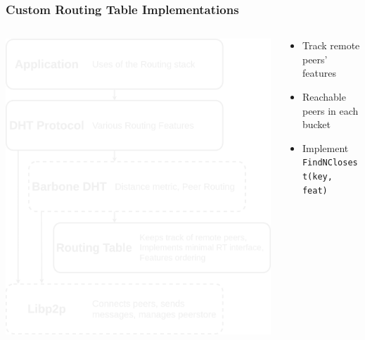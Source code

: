 \documentclass{../pl-slide}
\begin{document}
\begin{frame}
\frametitle{Custom Routing Table Implementations}

\begin{columns}[onlytextwidth]
	\begin{column}{0.44\textwidth}
	    		\begin{center}
        		\includegraphics[scale=.14]{resources/composable-dht-stack.png}\\
        		\end{center}
	\end{column}
	\begin{column}{0.55\textwidth}
		\begin{itemize}
			\itemc Routing Tables can be tailored to fit applications special needs
			\itemc Must follow a simple interface with which the Barebone DHT will interact
			\bigskip
			\item[\greencube] Track remote peers' features
			\item[\greencube] Reachable peers in each bucket
			\item[\greencube] Implement \texttt{FindNClosest(key, feat)}
		\end{itemize}
	\end{column}

\end{columns}
\end{frame}
\end{document}
